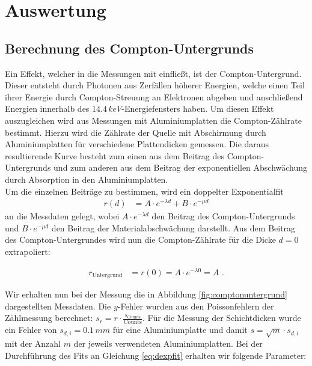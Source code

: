 \section{Auswertung}

\subsection{Berechnung des Compton-Untergrunds}

Ein Effekt, welcher in die Messungen mit einfließt, ist der Compton-Untergrund. Dieser entsteht durch Photonen aus Zerfällen höherer Energien, welche einen Teil ihrer Energie durch Compton-Streuung an Elektronen abgeben und anschließend Energien innerhalb des $14.4\,\si{keV}$-Energiefensters haben. Um diesen Effekt auszugleichen wird aus Messungen mit Aluminiumplatten die Compton-Zählrate bestimmt. Hierzu wird die Zählrate der Quelle mit Abschirmung durch Aluminiumplatten für verschiedene Plattendicken gemessen. Die daraus resultierende Kurve besteht zum einen aus dem Beitrag des Compton-Untergrunds und zum anderen aus dem Beitrag der exponentiellen Abschwächung durch Absorption in den Aluminiumplatten.\\

Um die einzelnen Beiträge zu bestimmen, wird ein doppelter Exponentialfit
\begin{align}
	r(d)&=A\cdot e^{-\lambda d}+B\cdot e^{-\mu d}
\end{align}
an die Messdaten gelegt, wobei $A\cdot e^{-\lambda d}$ den Beitrag des Compton-Untergrunds und $B\cdot e^{-\mu d}$ den Beitrag der Materialabschwächung darstellt. Aus dem Beitrag des Compton-Untergrundes wird nun die Compton-Zählrate für die Dicke $d=0$ extrapoliert:

\begin{align}
	r_\text{Untergrund}&=r(0)=A\cdot e^{-\lambda 0}=A\text{ .}\label{eq:dexpfit}
\end{align}


Wir erhalten nun bei der Messung die in Abbildung \ref{fig:comptonuntergrund} dargestellten Messdaten. Die $y$-Fehler wurden aus den Poissonfehlern der Zählmessung berechnet: $s_r=r\cdot\frac{s_\text{Counts}}{\mathrm{Counts}}$. Für die Messung der Schichtdicken wurde ein Fehler von $s_{d,i}=0.1\,\si{mm}$ für eine Aluminiumplatte und damit $s=\sqrt{m}\cdot s_{d,i}$ mit der Anzahl $m$ der jeweils verwendeten Aluminiumplatten. Bei der Durchführung des Fits an Gleichung \ref{eq:dexpfit} erhalten wir folgende Parameter:

